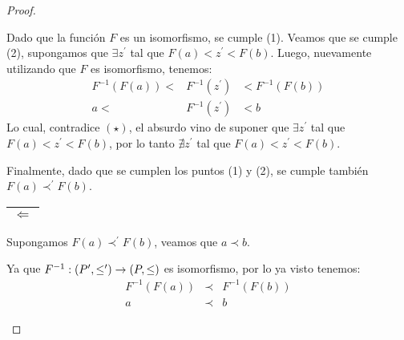 \begin{proof}
\begin{enumerate}[a)]
        \PN Dado que la función $F$ es un isomorfismo, se cumple (1). Veamos que se cumple (2), supongamos que $\exists
        z^{\prime}$ tal que $F(a) < z^{\prime} < F(b)$. Luego, nuevamente utilizando que $F$ es isomorfismo, tenemos:
        \begin{eqnarray*}
    			F^{-1}(F(a)) < &F^{-1}(z^{\prime})& < F^{-1}(F(b)) \\
    			a < &F^{-1}(z^{\prime})& < b
    		\end{eqnarray*}
        \PN Lo cual, contradice $(\star)$, el absurdo vino de suponer que $\exists z^{\prime}$ tal que
        $F(a) < z^{\prime} < F(b)$, por lo tanto $\nexists z^{\prime}$ tal que $F(a) < z^{\prime} < F(b)$.

        \PN Finalmente, dado que se cumplen los puntos (1) y (2), se cumple también $F(a) \prec^{\prime} F(b)$.

        \PN \begin{tabular}{|c|} \hline $\Leftarrow$ \\\hline \end{tabular} Supongamos $F(a) \prec^{\prime} F(b)$,
        veamos que $a \prec b$.

		    \PN Ya que $F^{-1}: (P^{\prime}, \leq^{\prime}) \rightarrow (P, \leq)$ es isomorfismo, por lo ya visto tenemos:
    		\begin{eqnarray*}
    			F^{-1}(F(a)) &\prec& F^{-1}(F(b)) \\
    			a &\prec& b
    		\end{eqnarray*}
    \end{enumerate}
  \end{proof}

